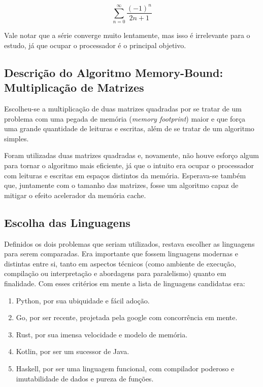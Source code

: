 \documentclass{article}
\begin{document}
\begin{equation}
    \sum_{n=0}^{\infty} \frac{\left ( -1 \right )^{n} }{ 2n+1 }
\end{equation}

Vale notar que a série converge muito lentamente, mas isso é irrelevante para o estudo, já que ocupar o processador é o principal objetivo.

\subsection{Descrição do Algoritmo Memory-Bound: Multiplicação de Matrizes}
\label{ssec:descricao algoritmo matriz}

Escolheu-se a multiplicação de duas matrizes quadradas por se tratar de um problema com uma pegada de memória (\emph{memory footprint}) maior e que força uma grande quantidade de leituras e escritas, além de se tratar de um algoritmo simples.

Foram utilizadas duas matrizes quadradas e, novamente, não houve esforço algum para tornar o algoritmo mais eficiente, já que o intuito era ocupar o processador com leituras e escritas em espaços distintos da memória. Esperava-se também que, juntamente com o tamanho das matrizes, fosse um algoritmo capaz de mitigar o efeito acelerador da memória cache.

\subsection{Escolha das Linguagens}
\label{ssec:escolha linguagens}

Definidos os dois problemas que seriam utilizados, restava escolher as linguagens para serem comparadas. Era importante que fossem linguagens modernas e distintas entre si, tanto em aspectos técnicos (como ambiente de execução, compilação ou interpretação e abordagens para paralelismo) quanto em finalidade. Com esses critérios em mente a lista de linguagens candidatas era:

\begin{enumerate}
    \item Python, por sua ubiquidade e fácil adoção.
    \item Go, por ser recente, projetada pela google com concorrência em mente.
    \item Rust, por sua imensa velocidade e modelo de memória.
    \item Kotlin, por ser um sucessor de Java.
    \item Haskell, por ser uma linguagem funcional, com compilador poderoso e imutabilidade de dados e pureza de funções.
\end{enumerate}
\end{document}
